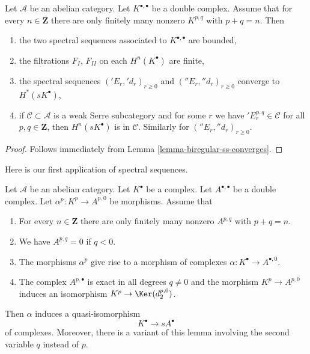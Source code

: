 \begin{lemma}
\label{lemma-first-quadrant-ss}
Let $\mathcal{A}$ be an abelian category. Let $K^{\bullet, \bullet}$
be a double complex. Assume that for every $n \in \mathbf{Z}$ there are
only finitely many nonzero $K^{p, q}$ with $p + q = n$. Then
\begin{enumerate}
\item the two spectral sequences associated to $K^{\bullet, \bullet}$
are bounded,
\item the filtrations $F_I$, $F_{II}$ on each $H^n(K^\bullet)$ are finite,
\item the spectral sequences $({}'E_r, {}'d_r)_{r \geq 0}$ and
$({}''E_r, {}''d_r)_{r \geq 0}$ converge to $H^*(sK^\bullet)$,
\item if $\mathcal{C} \subset \mathcal{A}$ is a weak Serre subcategory
and for some $r$ we have ${}'E_r^{p, q} \in \mathcal{C}$ for all
$p, q \in \mathbf{Z}$, then $H^n(sK^\bullet)$ is in $\mathcal{C}$.
Similarly for $({}''E_r, {}''d_r)_{r \geq 0}$.
\end{enumerate}
\end{lemma}

\begin{proof}
Follows immediately from Lemma \ref{lemma-biregular-ss-converges}.
\end{proof}

\noindent
Here is our first application of spectral sequences.

\begin{lemma}
\label{lemma-double-complex-gives-resolution}
Let $\mathcal{A}$ be an abelian category.
Let $K^\bullet$ be a complex.
Let $A^{\bullet, \bullet}$ be a double complex.
Let $\alpha^p : K^p \to A^{p, 0}$ be morphisms.
Assume that
\begin{enumerate}
\item For every $n \in \mathbf{Z}$ there are only finitely many nonzero
$A^{p, q}$ with $p + q = n$.
\item We have $A^{p, q} = 0$ if $q < 0$.
\item The morphisms $\alpha^p$ give rise to a morphism
of complexes $\alpha : K^\bullet \to A^{\bullet, 0}$.
\item The complex $A^{p, \bullet}$ is exact in all degrees
$q \not = 0$ and the morphism $K^p \to A^{p, 0}$ induces
an isomorphism $K^p \to \Ker(d_2^{p, 0})$.
\end{enumerate}
Then $\alpha$ induces a quasi-isomorphism
$$
K^\bullet \longrightarrow sA^\bullet
$$
of complexes.
Moreover, there is a variant of this lemma involving the second
variable $q$ instead of $p$.
\end{lemma}

